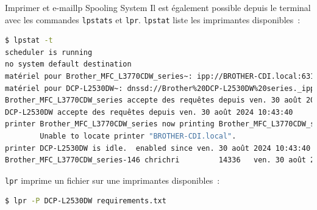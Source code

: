 \documentclass{beamer}
\begin{document}
    \begin{frame}[fragile]{Imprimer et e-mail}{lp Spooling System}
        Il est également possible depuis le terminal avec les commandes \lstinline{lpstats} et \lstinline{lpr}.
        \bigbreak
        \lstinline{lpstat} liste les imprimantes disponibles~:
        \begin{lstlisting}[language=bash,basicstyle=\tiny\ttfamily]
$ lpstat -t
scheduler is running
no system default destination
matériel pour Brother_MFC_L3770CDW_series~: ipp://BROTHER-CDI.local:631/ipp/print
matériel pour DCP-L2530DW~: dnssd://Brother%20DCP-L2530DW%20series._ipp._tcp.local/?uuid=e3248000-80ce-11db-8000-5c61997a44ed
Brother_MFC_L3770CDW_series accepte des requêtes depuis ven. 30 août 2024 13:38:42
DCP-L2530DW accepte des requêtes depuis ven. 30 août 2024 10:43:40
printer Brother_MFC_L3770CDW_series now printing Brother_MFC_L3770CDW_series-146.  enabled since ven. 30 août 2024 13:38:42
        Unable to locate printer "BROTHER-CDI.local".
printer DCP-L2530DW is idle.  enabled since ven. 30 août 2024 10:43:40
Brother_MFC_L3770CDW_series-146 chrichri         14336   ven. 30 août 2024 10:43:11
        \end{lstlisting}
        \lstinline{lpr} imprime un fichier sur une imprimantes disponibles~:
        \begin{lstlisting}[language=bash,basicstyle=\tiny\ttfamily]
$ lpr -P DCP-L2530DW requirements.txt
        \end{lstlisting}
    \end{frame}
\end{document}
